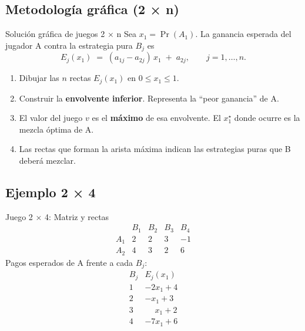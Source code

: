 \documentclass{beamer}
\begin{document}
\subsection{Metodología gráfica (2 × n)}
\begin{frame}{Solución gráfica de juegos 2 × n}
\small
Sea \(x_1=\Pr(A_1)\).  
La ganancia esperada del jugador A contra la estrategia pura \(B_j\) es  
\[
E_j(x_1)\;=\;(a_{1j}-a_{2j})\,x_1\;+\;a_{2j},
\qquad j=1,\dots,n.
\]
\begin{enumerate}[<+->]
  \item Dibujar las \(n\) rectas \(E_j(x_1)\) en \(0\le x_1\le1\).
  \item Construir la \textbf{envolvente inferior}.  
        Representa la “peor ganancia” de A.
  \item El valor del juego \(v\) es el \textbf{máximo} de esa envolvente.  
        El \(x_1^\star\) donde ocurre es la mezcla óptima de A.
  \item Las rectas que forman la arista máxima indican las estrategias puras
        que B deberá mezclar.
\end{enumerate}
\end{frame}

\subsection{Ejemplo 2 × 4}
\begin{frame}{Juego 2 × 4: Matriz y rectas}
\[
\begin{array}{c|cccc}
      & B_1 & B_2 & B_3 & B_4\\\hline
A_1 & 2 & 2 & 3 & -1\\
A_2 & 4 & 3 & 2 &  6
\end{array}
\]
\medskip
Pagos esperados de A frente a cada \(B_j\):
\[
\begin{array}{c|c}
B_j & E_j(x_1)\\\hline
1 & -2x_1+4\\
2 & -x_1+3\\
3 & \phantom{-}x_1+2\\
4 & -7x_1+6
\end{array}
\]
\end{frame}
\end{document}

